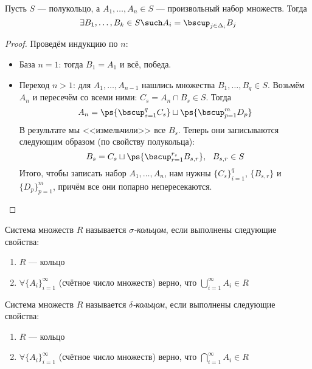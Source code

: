 \begin{lemma} \label{disruption_lemma}
	Пусть $S$ --- полукольцо, а $A_1, \ldots, A_n \in S$ --- произвольный набор множеств. Тогда
	\[
		\exists B_1, \ldots, B_k \in S \such A_i = \bscup_{j \in \Delta_i} B_j
	\]
\end{lemma}

\begin{proof}
	Проведём индукцию по $n$:
	\begin{itemize}
		\item База $n = 1$: тогда $B_1 = A_1$ и всё, победа.
		
		\item Переход $n > 1$: для $A_1, \ldots, A_{n - 1}$ нашлись множества $B_1, \ldots, B_q \in S$. Возьмём $A_n$ и пересечём со всеми ними: $C_s = A_n \cap B_s \in S$. Тогда
		\[
			A_n = \ps{\bscup_{s = 1}^q C_s} \sqcup \ps{\bscup_{p = 1}^m D_p}
		\]
		В результате мы <<измельчили>> все $B_s$. Теперь они записываются следующим образом (по свойству полукольца):
		\[
			B_s = C_s \sqcup \ps{\bscup_{r = 1}^{r_s} B_{s, r}},\ \ B_{s, r} \in S
		\]
		Итого, чтобы записать набор $A_1, \ldots, A_n$, нам нужны $\{C_s\}_{i = 1}^q$, $\{B_{s, r}\}$ и $\{D_p\}_{p = 1}^m$, причём все они попарно непересекаются.
	\end{itemize}
\end{proof}

\begin{definition}
	Система множеств $R$ называется \textit{$\sigma$-кольцом}, если выполнены следующие свойства:
	\begin{enumerate}
		\item $R$ --- кольцо
		
		\item $\forall \{A_i\}_{i = 1}^\infty$ (счётное число множеств) верно, что $\bigcup_{i = 1}^\infty A_i \in R$
	\end{enumerate}
\end{definition}

\begin{definition}
	Система множеств $R$ называется \textit{$\delta$-кольцом}, если выполнены следующие свойства:
	\begin{enumerate}
		\item $R$ --- кольцо
		
		\item $\forall \{A_i\}_{i = 1}^\infty$ (счётное число множеств) верно, что $\bigcap_{i = 1}^\infty A_i \in R$
	\end{enumerate}
\end{definition}

